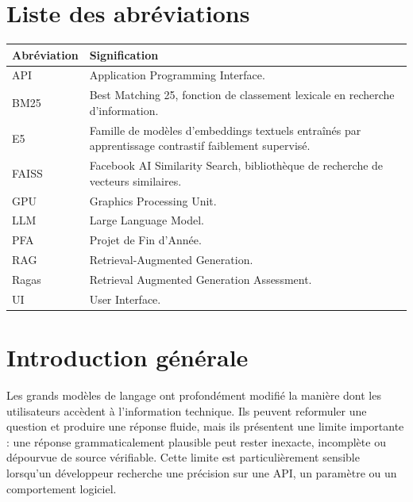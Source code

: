 \documentclass[12pt,a4paper,oneside]{report}
\begin{document}
\chapter*{Liste des abréviations}
\begin{longtable}{@{}p{3cm}p{10.5cm}@{}}
\toprule
\textbf{Abréviation} & \textbf{Signification}\\
\midrule
\endhead
API & Application Programming Interface.\\
BM25 & Best Matching 25, fonction de classement lexicale en recherche d'information.\\
E5 & Famille de modèles d'embeddings textuels entraînés par apprentissage contrastif faiblement supervisé.\\
FAISS & Facebook AI Similarity Search, bibliothèque de recherche de vecteurs similaires.\\
GPU & Graphics Processing Unit.\\
LLM & Large Language Model.\\
PFA & Projet de Fin d'Année.\\
RAG & Retrieval-Augmented Generation.\\
Ragas & Retrieval Augmented Generation Assessment.\\
UI & User Interface.\\
\bottomrule
\end{longtable}

\clearpage
{}
\setcounter{page}{1}

\chapter*{Introduction générale}

Les grands modèles de langage ont profondément modifié la manière dont les
utilisateurs accèdent à l'information technique. Ils peuvent reformuler une
question et produire une réponse fluide, mais ils présentent une limite
importante : une réponse grammaticalement plausible peut rester inexacte,
incomplète ou dépourvue de source vérifiable. Cette limite est particulièrement
sensible lorsqu'un développeur recherche une précision sur une API, un paramètre
ou un comportement logiciel.
\end{document}
